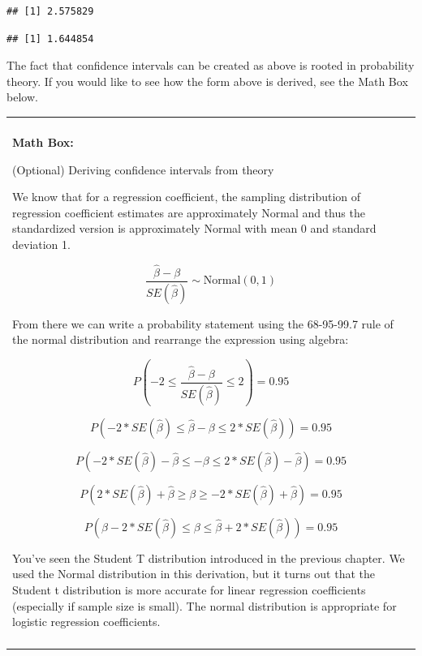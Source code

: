 \documentclass[
]{book}
\newenvironment{Shaded}{\begin{snugshade}}{\end{snugshade}}
\newcommand{\CommentTok}[1]{\textcolor[rgb]{0.56,0.35,0.01}{\textit{#1}}}
\newcommand{\DecValTok}[1]{\textcolor[rgb]{0.00,0.00,0.81}{#1}}
\newcommand{\FloatTok}[1]{\textcolor[rgb]{0.00,0.00,0.81}{#1}}
\newcommand{\KeywordTok}[1]{\textcolor[rgb]{0.13,0.29,0.53}{\textbf{#1}}}
\newcommand{\NormalTok}[1]{#1}
\newcommand{\OperatorTok}[1]{\textcolor[rgb]{0.81,0.36,0.00}{\textbf{#1}}}
\newcommand{\StringTok}[1]{\textcolor[rgb]{0.31,0.60,0.02}{#1}}
\newenvironment{mathbox}
{
    \begin{center}
    
    \begin{tabular}{|p{0.8\textwidth}|}
    \rowcolor{LightYellow}
    \hline\\
    \rowcolor{LightYellow}
    \textbf{Math Box:}
}
{
    \\\rowcolor{LightYellow}
    \\\hline
    \end{tabular} 
    \end{center}
}
\begin{document}
\begin{verbatim}
## [1] 2.575829
\end{verbatim}

\begin{Shaded}
\end{Shaded}

\begin{verbatim}
## [1] 1.644854
\end{verbatim}

The fact that confidence intervals can be created as above is rooted in probability theory. If you would like to see how the form above is derived, see the Math Box below.

\begin{mathbox}
(Optional) Deriving confidence intervals from theory

We know that for a regression coefficient, the sampling distribution of
regression coefficient estimates are approximately Normal and thus the
standardized version is approximately Normal with mean 0 and standard
deviation 1.

\[\frac{\hat{\beta} - \beta}{SE(\hat{\beta})} \sim \text{Normal}(0,1)\]

From there we can write a probability statement using the 68-95-99.7
rule of the normal distribution and rearrange the expression using
algebra:

\[P(-2\leq\frac{\hat{\beta} - \beta}{SE(\hat{\beta})}\leq2) = 0.95\]

\[P(-2 *SE(\hat{\beta})\leq\hat{\beta} - \beta \leq2 *SE(\hat{\beta}) ) = 0.95\]

\[P(-2* SE(\hat{\beta})-\hat{\beta} \leq  -\beta \leq2 *SE(\hat{\beta})-\hat{\beta} ) = 0.95\]

\[P(2 *SE(\hat{\beta})+\hat{\beta} \geq \beta \geq -2* SE(\hat{\beta})+\hat{\beta} ) = 0.95\]

\[P(\hat{\beta}-2 *SE(\hat{\beta}) \leq \beta \leq\hat{\beta}+2 *SE(\hat{\beta}) ) = 0.95\]

You've seen the Student T distribution introduced in the previous
chapter. We used the Normal distribution in this derivation, but it
turns out that the Student t distribution is more accurate for linear
regression coefficients (especially if sample size is small). The normal
distribution is appropriate for logistic regression coefficients.
\end{mathbox}
\end{document}
